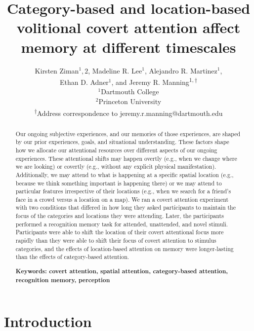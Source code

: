 \documentclass[english]{article}
\begin{document}
\title{Category-based and location-based volitional covert attention affect
memory at different timescales}

\author{Kirsten Ziman$^1, 2$,
Madeline R. Lee$^1$,
Alejandro R. Martinez$^1$,\\
Ethan D. Adner$^1$,
and
Jeremy R. Manning\textsuperscript{$1, \dagger$}\\[0.1in]$^1$Dartmouth College\\
$^2$Princeton University\\
\textsuperscript{$\dagger$}Address correspondence to jeremy.r.manning@dartmouth.edu}

\maketitle

\begin{abstract} 
  
Our ongoing subjective experiences, and our memories of those experiences, are
shaped by our prior experiences, goals, and situational understanding. These
factors shape how we allocate our attentional resources over different aspects
of our ongoing experiences. These attentional shifts may happen overtly (e.g.,
when we change where we are looking) or covertly (e.g., without any explicit
physical manifestation). Additionally, we may attend to what is happening at a
specific spatial location (e.g., because we think something important is
happening there) or we may attend to particular features irrespective of their
locations (e.g., when we search for a friend's face in a crowd versus a
location on a map). We ran a covert attention experiment with two conditions
that differed in how long they asked participants to maintain the focus of the
categories and locations they were attending. Later, the participants performed
a recognition memory task for attended, unattended, and novel stimuli.
Participants were able to shift the location of their covert attentional focus
more rapidly than they were able to shift their focus of covert attention to
stimulus categories, and the effects of location-based attention on memory were
longer-lasting than the effects of category-based attention.

\noindent\textbf{Keywords: covert attention, spatial attention, category-based
attention, recognition memory, perception}

\end{abstract}


\section*{Introduction} 
\end{document}
